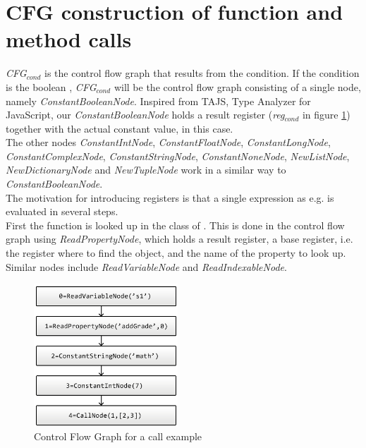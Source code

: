 \section{CFG construction of function and method calls}
\textit{CFG$_{\textit{cond}}$} is the control flow graph that results from the condition. If the condition is the boolean , \textit{CFG$_{\textit{cond}}$} will be the control flow graph consisting of a single node, namely \textit{ConstantBooleanNode}. Inspired from TAJS, Type Analyzer for JavaScript, our \textit{ConstantBooleanNode} holds a result register (\textit{reg$_{\textit{cond}}$} in figure \ref{fig:callCfg}) together with the actual constant value,  in this case. \\
The other nodes \textit{ConstantIntNode}, \textit{ConstantFloatNode}, \textit{ConstantLongNode}, \textit{ConstantComplexNode}, \textit{ConstantStringNode}, \textit{ConstantNoneNode}, \textit{NewListNode}, \textit{NewDictionaryNode} and \textit{NewTupleNode} work in a similar way to \textit{ConstantBooleanNode}. \\
The motivation for introducing registers is that a single expression as e.g.  is evaluated in several steps. \\
First the function  is looked up in the class of . This is done in the control flow graph using \textit{ReadPropertyNode}, which holds a result register, a base register, i.e. the register where to find the object, and the name of the property to look up. Similar nodes include \textit{ReadVariableNode} and \textit{ReadIndexableNode}. \\
\begin{figure}
	\vspace{-20pt}
	\begin{center}
		\includegraphics[width=0.48\textwidth]{images/Call-example.png}
	\end{center}
	\vspace{-10pt}
	\caption{Control Flow Graph for a call example}
	\label{fig:callCfg}
	\vspace{-10pt}
\end{figure}
